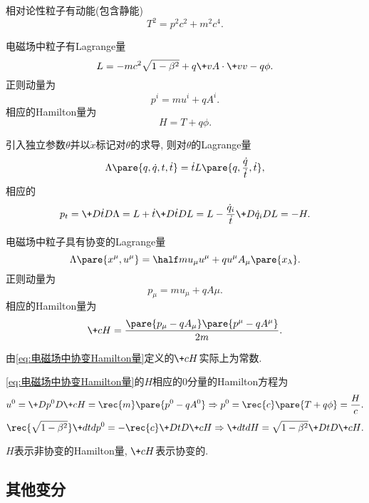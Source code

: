 \documentclass[../TheoreticalMechanics.tex]{subfiles}
\begin{document}
\begin{lemma}[相对论性动能]
    相对论性粒子有动能(包含静能)
    \[ T^2 = p^2c^2 + m^2c^4. \]
\end{lemma}
\begin{lemma}[电磁场中的力学量]
    电磁场中粒子有Lagrange量
    \[ L = -mc^2\sqrt{1-\beta^2} + q\+vA\cdot\+vv - q\phi. \]
    正则动量为
    \[ p^i = mu^i + qA^i. \]
    相应的Hamilton量为
    \[ H = T + q\phi. \]
\end{lemma}
\begin{lemma}[Hamilton量作为时间的动量]
    引入独立参数$\theta$并以$\dot{x}$标记对$\theta$的求导, 则对$\theta$的Lagrange量
    \[ \Lambda\pare{q,\dot{q},t,\dot{t}} = \dot{t}L\pare{q,\frac{\dot{q}}{\dot{t}},\dot{t}}, \]
    相应的
    \begin{equation}
        \label{eq:Hamilton作为时间的共轭动量}
        p_t = \+D{\dot{t}}D{\Lambda} = L + \dot{t}\+D{\dot{t}}DL = L - \frac{\dot{q}_i}{\dot{t}}\+D{\dot{q}_i}DL = -H. 
    \end{equation}
\end{lemma}
\begin{lemma}[电磁场中协变力学量]
    电磁场中粒子具有协变的Lagrange量
    \[ \Lambda\pare{x^\mu, u^\mu} = \half mu_\mu u^\mu + qu^\mu A_\mu\pare{x_\lambda}. \]
    正则动量为
    \[ p_\mu = mu_\mu + qA\mu. \]
    相应的Hamilton量为
    \begin{equation}
        \label{eq:电磁场中协变Hamilton量}
        \+cH = \frac{\pare{p_\mu - qA_\mu}\pare{p^\mu - qA^\mu}}{2m}. 
    \end{equation}
\end{lemma}
\begin{remark}
    由\eqref{eq:电磁场中协变Hamilton量}定义的$\+cH$实际上为常数.
\end{remark}
\begin{ex}
    \eqref{eq:电磁场中协变Hamilton量}的$H$相应的$0$分量的Hamilton方程为
    \[ u^0 = \+D{p^0}D{\+cH} = \rec{m}\pare{p^0 - qA^0}\Rightarrow p^0 = \rec{c}\pare{T+q\phi} = \frac{H}{c}. \]
    \[ \rec{\sqrt{1-\beta^2}}\+dtd{p^0} = -\rec{c}\+DtD{\+cH}\Rightarrow \+dtdH = \sqrt{1-\beta^2}\+DtD{\+cH}. \]
\end{ex}
\begin{pitfall}
    $H$表示非协变的Hamilton量, $\+cH$表示协变的.
\end{pitfall}



\subsection{其他变分} %
\label{sub:其他变分}
\end{document}
